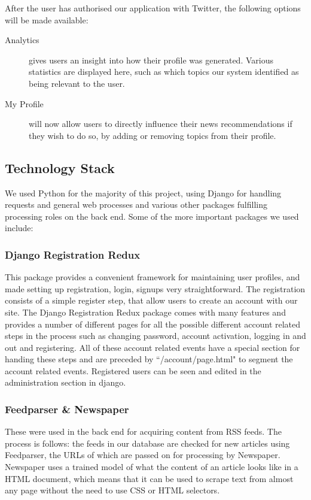 \documentclass[11pt]{article}
\begin{document}
After the user has authorised our application with Twitter, the following options will be made available: 
\begin{description}
\item[Analytics] gives users an insight into how their profile was generated. Various statistics are displayed here, such as which topics our system identified as being relevant to the user.
\item[My Profile] will now allow users to directly influence their news recommendations if they wish to do so, by adding or removing topics from their profile.
\end{description}

\subsection{Technology Stack}
We used Python for the majority of this project, using Django for handling requests and general web processes and various other packages fulfilling processing roles on the back end. Some of the more important packages we used include:
\subsubsection*{Django Registration Redux}
 This package provides a convenient framework for maintaining user profiles, and made setting up registration, login, signups very straightforward. The registration consists of a simple register step, that allow users to create an account with our site. The Django Registration Redux package comes with many features and provides a number of different pages for all the possible different account related steps in the process such as changing password, account activation, logging in and out and registering.  All of these account related events have a special section for handing these steps and are preceded by ``/account/page.html" to segment the account related events. Registered users can be seen and edited in the administration section in django. 
\subsubsection*{Feedparser \& Newspaper}
These were used in the back end for acquiring content from RSS feeds. The process is follows: the feeds in our database are checked for new articles using Feedparser, the URLs of which are passed on for processing by Newspaper. Newspaper uses a trained model of what the content of an article looks like in a HTML document, which means that it can be used to scrape text from almost any page without the need to use CSS or HTML selectors. 
\end{document}
